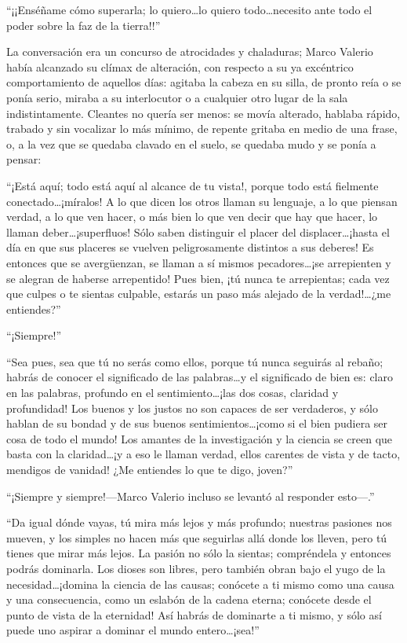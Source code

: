 \documentclass[11pt,openany]{book}
\begin{document}
“¡¡Enséñame cómo superarla; lo quiero\dots lo quiero todo\dots necesito ante todo el poder sobre la faz de la tierra!!” 

La conversación era un concurso de atrocidades y chaladuras; Marco Valerio había alcanzado su clímax de alteración, con respecto a su ya excéntrico comportamiento de aquellos días: agitaba la cabeza en su silla, de pronto reía o se ponía serio, miraba a su interlocutor o a cualquier otro lugar de la sala indistintamente. Cleantes no quería ser menos: se movía alterado, hablaba rápido, trabado y sin vocalizar lo más mínimo, de repente gritaba en medio de una frase, o, a la vez que se quedaba clavado en el suelo, se quedaba mudo y se ponía a pensar: 

“¡Está aquí; todo está aquí al alcance de tu vista!, porque todo está fielmente conectado\dots ¡míralos! A lo que dicen los otros llaman su lenguaje, a lo que piensan verdad, a lo que ven hacer, o más bien lo que ven decir que hay que hacer, lo llaman deber\dots ¡superfluos! Sólo saben distinguir el placer del displacer\dots ¡hasta el día en que sus placeres se vuelven peligrosamente distintos a sus deberes! Es entonces que se avergüenzan, se llaman a sí mismos pecadores\dots ¡se arrepienten y se alegran de haberse arrepentido! Pues bien, ¡tú nunca te arrepientas; cada vez que culpes o te sientas culpable, estarás un paso más alejado de la verdad!\dots ¿me entiendes?” 

“¡Siempre!” 

“Sea pues, sea que tú no serás como ellos, porque tú nunca seguirás al rebaño; habrás de conocer el significado de las palabras\dots y el significado de bien es: claro en las palabras, profundo en el sentimiento\dots ¡las dos cosas, claridad y profundidad! Los buenos y los justos no son capaces de ser verdaderos, y sólo hablan de su bondad y de sus buenos sentimientos\dots ¡como si el bien pudiera ser cosa de todo el mundo! Los amantes de la investigación y la ciencia se creen que basta con la claridad\dots ¡y a eso le llaman verdad, ellos carentes de vista y de tacto, mendigos de vanidad! ¿Me entiendes lo que te digo, joven?” 

“¡Siempre y siempre!—Marco Valerio incluso se levantó al responder esto—.” 

“Da igual dónde vayas, tú mira más lejos y más profundo; nuestras pasiones nos mueven, y los simples no hacen más que seguirlas allá donde los lleven, pero tú tienes que mirar más lejos. La pasión no sólo la sientas; compréndela y entonces podrás dominarla. Los dioses son libres, pero también obran bajo el yugo de la necesidad\dots ¡domina la ciencia de las causas; conócete a ti mismo como una causa y una consecuencia, como un eslabón de la cadena eterna; conócete desde el punto de vista de la eternidad! Así habrás de dominarte a ti mismo, y sólo así puede uno aspirar a dominar el mundo entero\dots ¡sea!” 
\end{document}
